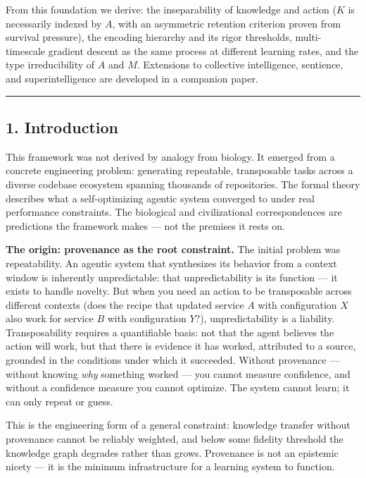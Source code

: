 \documentclass[
]{article}
\begin{document}
From this foundation we derive: the inseparability of knowledge and
action (\(K\) is necessarily indexed by \(A\), with an asymmetric
retention criterion proven from survival pressure), the encoding
hierarchy and its rigor thresholds, multi-timescale gradient descent as
the same process at different learning rates, and the type
irreducibility of \(A\) and \(M\). Extensions to collective
intelligence, sentience, and superintelligence are developed in a
companion paper.

\begin{center}\rule{0.5\linewidth}{0.5pt}\end{center}

\subsection{1. Introduction}\label{introduction}

This framework was not derived by analogy from biology. It emerged from
a concrete engineering problem: generating repeatable, transposable
tasks across a diverse codebase ecosystem spanning thousands of
repositories. The formal theory describes what a self-optimizing agentic
system converged to under real performance constraints. The biological
and civilizational correspondences are predictions the framework makes
--- not the premises it rests on.

\textbf{The origin: provenance as the root constraint.} The initial
problem was repeatability. An agentic system that synthesizes its
behavior from a context window is inherently unpredictable: that
unpredictability is its function --- it exists to handle novelty. But
when you need an action to be transposable across different contexts
(does the recipe that updated service \(A\) with configuration \(X\)
also work for service \(B\) with configuration \(Y\)?), unpredictability
is a liability. Transposability requires a quantifiable basis: not that
the agent believes the action will work, but that there is evidence it
has worked, attributed to a source, grounded in the conditions under
which it succeeded. Without provenance --- without knowing \emph{why}
something worked --- you cannot measure confidence, and without a
confidence measure you cannot optimize. The system cannot learn; it can
only repeat or guess.

This is the engineering form of a general constraint: knowledge transfer
without provenance cannot be reliably weighted, and below some fidelity
threshold the knowledge graph degrades rather than grows. Provenance is
not an epistemic nicety --- it is the minimum infrastructure for a
learning system to function.
\end{document}
